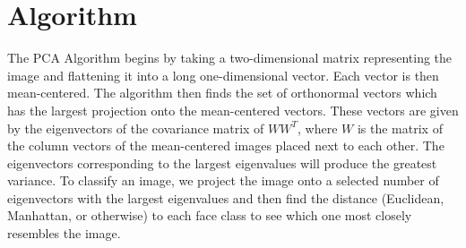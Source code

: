 \documentclass[letterpaper]{article}
\begin{document}
\section{Algorithm}
The PCA Algorithm begins by taking a two-dimensional matrix representing the image and flattening it into a long one-dimensional vector.  Each vector is then mean-centered.  The algorithm then finds the set of orthonormal vectors which has the largest projection onto the mean-centered vectors. These vectors are given by the eigenvectors of the covariance matrix of $WW^T$, where $W$ is the matrix of the column vectors of the mean-centered images placed next to each other.  The eigenvectors corresponding to the largest eigenvalues will produce the greatest variance.  To classify an image, we project the image onto a selected number of eigenvectors with the largest eigenvalues and then find the distance (Euclidean, Manhattan, or otherwise) to each face class to see which one most closely resembles the image.
\end{document}
